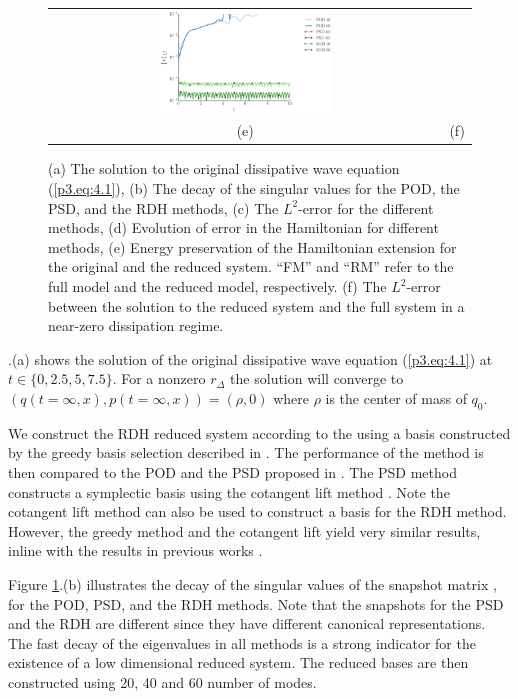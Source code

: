 \begin{figure}
\begin{tabular}{cc}
\includegraphics[width=0.45\textwidth]{./images/paper3/wave/error_homo} \\
(e) & (f) 
\end{tabular}
\caption{(a) The solution to the original dissipative wave equation (\ref{p3.eq:4.1}), (b) The decay of the singular values for the POD, the PSD, and the RDH methods, (c) The $L^2$-error for the different methods, (d) Evolution of error in the Hamiltonian for different methods, (e) Energy preservation of the Hamiltonian extension for the original and the reduced system. ``FM'' and ``RM'' refer to the full model and the reduced model, respectively. (f) The $L^2$-error between the solution to the reduced system and the full system in a near-zero dissipation regime.} \label{fig:4.1}
\end{figure}

.(a) shows the solution of the original dissipative wave equation (\ref{p3.eq:4.1}) at $t \in \{0,2.5,5,7.5\}$. For a nonzero $r_\Delta$ the solution will converge to $(q(t=\infty,x),p(t=\infty,x)) = (\rho,0)$ where $\rho$ is the center of mass of $q_0$. 

We construct the RDH reduced system according to the  using a basis constructed by the greedy basis selection described in . The performance of the method is then compared to the POD and the PSD proposed in \cite{peng2016geometric}. The PSD method constructs a symplectic basis using the cotangent lift method \cite{peng2016geometric}. Note the cotangent lift method can also be used to construct a basis for the RDH method. However, the greedy method and the cotangent lift yield very similar results, inline with the results in previous works \cite{doi:10.1137/17M1111991}.

Figure \ref{fig:4.1}.(b) illustrates the decay of the singular values of the snapshot matrix \cite{hesthaven2015certified}, for the POD, PSD, and the RDH methods. Note that the snapshots for the PSD and the RDH are different since they have different canonical representations. The fast decay of the eigenvalues in all methods is a strong indicator for the existence of a low dimensional reduced system. The reduced bases are then constructed using 20, 40 and 60 number of modes.

